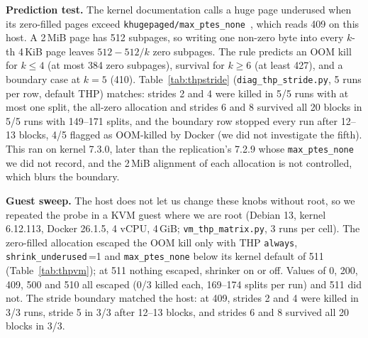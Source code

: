 \documentclass[conference]{IEEEtran}
\begin{document}
\textbf{Prediction test.} The kernel documentation calls a huge page underused when its
zero-filled pages exceed \texttt{khugepaged/max\_ptes\_none}~\cite{kernelthp}, which reads
409 on this host. A 2\,MiB page has 512 subpages, so writing one non-zero byte into every
$k$-th 4\,KiB page leaves $512-512/k$ zero subpages. The rule predicts an OOM kill for
$k\le4$ (at most 384 zero subpages), survival for $k\ge6$ (at least 427), and a boundary
case at $k{=}5$ (410). Table~\ref{tab:thpstride} (\texttt{diag\_thp\_stride.py}, 5 runs per row,
default THP) matches: strides 2 and 4 were killed in 5/5 runs with at most one split, the
all-zero allocation and strides 6 and 8 survived all 20 blocks in 5/5 runs with 149--171
splits, and the boundary row stopped every run after 12--13 blocks, 4/5 flagged as
OOM-killed by Docker (we did not investigate the fifth). This ran on kernel 7.3.0, later
than the replication's 7.2.9 whose \texttt{max\_ptes\_none} we did not record, and the
2\,MiB alignment of each allocation is not controlled, which blurs the boundary.

\begin{table}[t]
\centering
\caption{THP stride probe: one non-zero byte in every $k$-th page, 5 runs per row,
default THP, 150\,MB limit, \texttt{max\_ptes\_none}\,=\,409. \emph{Zero pages} is per
2\,MiB page.}
\label{tab:thpstride}
\small

\end{table}

\textbf{Guest sweep.} The host does not let us change these knobs without root, so we
repeated the probe in a KVM guest where we are root (Debian 13, kernel 6.12.113, Docker 26.1.5,
4 vCPU, 4\,GiB; \texttt{vm\_thp\_matrix.py}, 3 runs per cell). The zero-filled allocation
escaped the OOM kill only with THP \texttt{always}, \texttt{shrink\_underused}\,=1 and
\texttt{max\_ptes\_none} below its kernel default of 511 (Table~\ref{tab:thpvm}); at 511 nothing
escaped, shrinker on or off. Values of 0, 200, 409, 500 and 510 all escaped (0/3 killed
each, 169--174 splits per run) and 511 did not. The stride boundary matched the host: at
409, strides 2 and 4 were killed in 3/3 runs, stride 5 in 3/3 after 12--13 blocks, and
strides 6 and 8 survived all 20 blocks in 3/3.

\begin{table}[t]
\centering
\caption{Guest sweep, zero-filled allocation: OOM-killed runs out of 3 for each THP
policy, \texttt{shrink\_underused} setting and \texttt{max\_ptes\_none} value. Only THP
\texttt{always} with the shrinker on and \texttt{max\_ptes\_none}\,=409 escapes.}
\label{tab:thpvm}
\small

\end{table}
\end{document}
